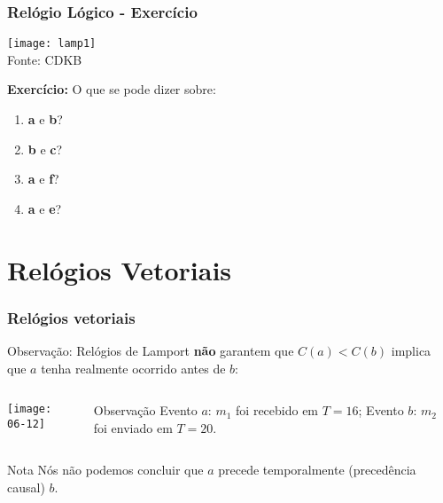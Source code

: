 \documentclass[Ligatures=TeX,table,brazil,svgnames,usetotalslideindicator,compress,10pt]{beamer}
\begin{document}
\begin{frame}
  \frametitle{Relógio Lógico - Exercício}
  {\centering
    \vspace{-4em}
    \texttt{[image: lamp1]}\\
    \vspace{-6em}
  \footnotesize{Fonte: CDKB}
}

\alert{\textbf{Exercício:}} O que se pode dizer sobre:
\begin{enumerate}
\item \textbf{a} e \textbf{b}?
\item \textbf{b} e \textbf{c}?
\item \textbf{a} e \textbf{f}?
\item \textbf{a} e \textbf{e}?
\end{enumerate}

\end{frame}


\section{Relógios Vetoriais}

\begin{frame}
  \frametitle{Relógios vetoriais}
  \begin{block}{Observação:}
    Relógios de Lamport \textbf{não} garantem que $C(a) < C(b)$ implica que $a$ \alert{tenha realmente ocorrido antes} de $b$:
  \end{block}

  \begin{columns}
    \begin{column}{0.4\textwidth}
      \texttt{[image: 06-12]}
    \end{column}

    \begin{column}{0.5\textwidth}
      \begin{block}{Observação}
        Evento $a$: $m_1$ foi recebido em $T = 16$; \newline
        Evento $b$: $m_2$ foi enviado em $T = 20$.
      \end{block}
    \end{column}
  \end{columns}

  \begin{alertblock}{Nota}
    Nós \alert{não podemos} concluir que $a$ precede temporalmente (precedência causal) $b$.
  \end{alertblock}

\end{frame}
\end{document}
